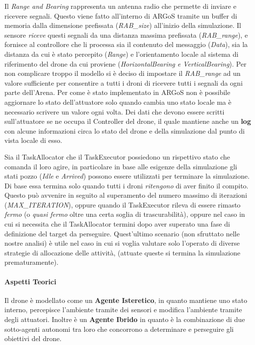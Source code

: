 \documentclass[a4paper,11pt,oneside, table]{article}
\begin{document}
Il \textit{Range and Bearing} rappresenta un antenna radio che permette di inviare e ricevere segnali. Questo viene fatto all'interno di ARGoS tramite un buffer di memoria dalla dimensione prefissata (\textit{RAB\_size}) all'inizio della simulazione.
Il sensore \textit{riceve} questi segnali da una distanza massima prefissata (\textit{RAB\_range}), e fornisce al controllore che li processa sia il contenuto del messaggio (\textit{Data}), sia la distanza da cui \`e stato percepito (\textit{Range}) e l'orientamento locale al sistema di riferimento del drone da cui proviene (\textit{HorizontalBearing e VerticalBearing}).
Per non complicare troppo il modello si \`e deciso di impostare il \textit{RAB\_range} ad un valore sufficiente per consentire a tutti i droni di ricevere tutti i segnali da ogni parte dell'Arena.
Per come \`e stato implementato in ARGoS non \`e possibile aggiornare lo stato dell'attuatore solo quando cambia uno stato locale ma \`e necessario scrivere un valore ogni volta. %
Dei dati che devono essere scritti sull'attuatore se ne occupa il Controller del drone, il quale mantiene anche un \textbf{log} con alcune informazioni circa lo stato del drone e della simulazione dal punto di vista locale di esso.

Sia il TaskAllocator che il TaskExecutor possiedono un rispettivo stato che comanda il loro agire, in particolare in base alle esigenze della simulazione gli stati pozzo (\textit{Idle} e \textit{Arrived}) possono essere utilizzati per terminare la simulazione.
Di base essa termina solo quando tutti i droni \textit{ritengono} di aver finito il compito. Questo pu\`o avvenire in seguito al superamento del numero massimo di iterazioni (\textit{MAX\_ITERATION}), oppure quando il TaskExecutor rileva di essere rimasto \textit{fermo} (o \textit{quasi fermo} oltre una certa soglia di trascurabilit\`a), oppure nel caso in cui si necessita che il TaskAllocator termini dopo aver superato una fase di definizione del target da perseguire.
Quest'ultimo scenario (non sfruttato nelle nostre analisi) \`e utile nel caso in cui si voglia valutare solo l'operato di diverse strategie di allocazione delle attivit\`a, (attuate queste si termina la simulazione prematuramente).

\paragraph{Aspetti Teorici}

Il drone \`e modellato come un \textbf{Agente Isteretico}, in quanto mantiene uno stato interno, percepisce l'ambiente tramite dei sensori e modifica l'ambiente tramite degli attuatori.
Inoltre \`e un \textbf{Agente Ibrido} in quanto \`e la combinazione di due sotto-agenti autonomi tra loro che concorrono a determinare e perseguire gli obiettivi del drone.
\end{document}
